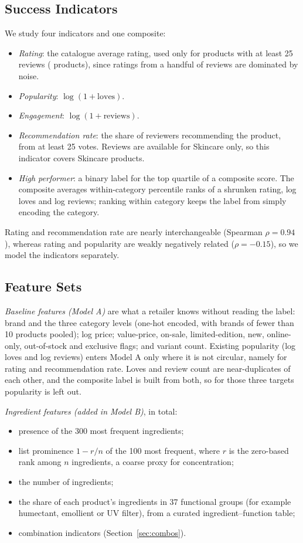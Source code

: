 \documentclass[11pt,a4paper]{article}
\begin{document}
\subsection{Success Indicators}
We study four indicators and one composite:
\begin{itemize}
\item \emph{Rating}: the catalogue average rating, used only for products with at least 25 reviews (\NRating{} products), since ratings from a handful of reviews are dominated by noise.
\item \emph{Popularity}: $\log(1+\text{loves})$.
\item \emph{Engagement}: $\log(1+\text{reviews})$.
\item \emph{Recommendation rate}: the share of reviewers recommending the product, from at least 25 votes. Reviews are available for Skincare only, so this indicator covers \NRecRate{} Skincare products.
\item \emph{High performer}: a binary label for the top quartile of a composite score. The composite averages within-category percentile ranks of a shrunken rating, log loves and log reviews; ranking within category keeps the label from simply encoding the category.
\end{itemize}
Rating and recommendation rate are nearly interchangeable (Spearman $\rho=0.94$), whereas rating and popularity are weakly negatively related ($\rho=-0.15$), so we model the indicators separately.

\subsection{Feature Sets}
\emph{Baseline features (Model A)} are what a retailer knows without reading the label: brand and the three category levels (one-hot encoded, with brands of fewer than 10 products pooled); log price; value-price, on-sale, limited-edition, new, online-only, out-of-stock and exclusive flags; and variant count. Existing popularity (log loves and log reviews) enters Model A only where it is not circular, namely for rating and recommendation rate. Loves and review count are near-duplicates of each other, and the composite label is built from both, so for those three targets popularity is left out.

\emph{Ingredient features (added in Model B)}, \NIngredientFeatures{} in total:
\begin{itemize}
\item presence of the 300 most frequent ingredients;
\item list prominence $1-r/n$ of the 100 most frequent, where $r$ is the zero-based rank among $n$ ingredients, a coarse proxy for concentration;
\item the number of ingredients;
\item the share of each product's ingredients in 37 functional groups (for example humectant, emollient or UV filter), from a curated ingredient--function table;
\item \NCombinations{} combination indicators (Section~\ref{sec:combos}).
\end{itemize}
\end{document}
